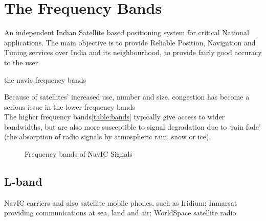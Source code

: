 




%


\section{The Frequency Bands}
An independent Indian Satellite based positioning system for critical National applications. The main objective is to provide Reliable Position, Navigation and Timing services over India and its neighbourhood, to provide fairly good accuracy to the user. 

	
	\begin{table}[!ht]
	\small
	\centering
	\caption{the navic frequency bands}
	\label{table:bands}
	
	\end{table}

Because of satellites’ increased use, number and size, congestion has become a serious issue in the lower frequency bands
\\
The higher frequency bands\ref{table:bands} typically give access to wider bandwidths, but are also more susceptible to signal degradation due to ‘rain fade’ (the absorption of radio signals by atmospheric rain, snow or ice).
	\begin{figure}[!ht]
	\centering
	
	\caption{Frequency bands of NavIC Signals}
	\label{figure:bandsfig}
	\end{figure}	
\subsection{L-band}
NavIC carriers and also satellite mobile phones, such as Iridium; Inmarsat providing communications at sea, land and air; WorldSpace satellite radio.

